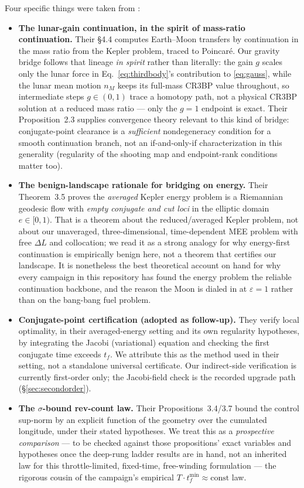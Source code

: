 \documentclass[11pt]{article}
\begin{document}
Four specific things were taken from \cite{BCP2010}:
\begin{itemize}
\item \textbf{The lunar-gain continuation, in the spirit of mass-ratio
  continuation.} Their \S 4.4 computes Earth--Moon transfers by
  continuation in the mass ratio from the Kepler problem, traced to
  Poincar\'e. Our gravity bridge follows that lineage \emph{in spirit}
  rather than literally: the gain $g$ scales only the lunar force in
  Eq.~\eqref{eq:thirdbody}'s contribution to \eqref{eq:gauss}, while the
  lunar mean motion $n_M$ keeps its full-mass CR3BP value throughout, so
  intermediate steps $g \in (0,1)$ trace a homotopy path, not a physical
  CR3BP solution at a reduced mass ratio --- only the $g = 1$ endpoint is
  exact. Their Proposition~2.3 supplies convergence theory relevant to
  this kind of bridge: conjugate-point clearance is a \emph{sufficient}
  nondegeneracy condition for a smooth continuation branch, not an
  if-and-only-if characterization in this generality (regularity of the
  shooting map and endpoint-rank conditions matter too).
\item \textbf{The benign-landscape rationale for bridging on energy.}
  Their Theorem~3.5 proves the \emph{averaged} Kepler energy problem is a
  Riemannian geodesic flow with \emph{empty conjugate and cut loci} in the
  elliptic domain $e \in [0,1)$. That is a theorem about the
  reduced/averaged Kepler problem, not about our unaveraged,
  three-dimensional, time-dependent MEE problem with free $\Delta L$ and
  collocation; we read it as a strong analogy for why energy-first
  continuation is empirically benign here, not a theorem that certifies
  our landscape. It is nonetheless the best theoretical account on hand
  for why every campaign in this repository has found the energy problem
  the reliable continuation backbone, and the reason the Moon is dialed in
  at $\varepsilon = 1$ rather than on the bang-bang fuel problem.
\item \textbf{Conjugate-point certification (adopted as follow-up).} They
  verify local optimality, in their averaged-energy setting and its own
  regularity hypotheses, by integrating the Jacobi (variational) equation
  and checking the first conjugate time exceeds $t_f$. We attribute this
  as the method used in their setting, not a standalone universal
  certificate. Our indirect-side verification is currently first-order
  only; the Jacobi-field check is the recorded upgrade path
  (\S\ref{sec:secondorder}).
\item \textbf{The $\sigma$-bound rev-count law.} Their
  Propositions~3.4/3.7 bound the control sup-norm by an explicit function
  of the geometry over the cumulated longitude, under their stated
  hypotheses. We treat this as a \emph{prospective comparison} --- to be
  checked against those propositions' exact variables and hypotheses once
  the deep-rung ladder results are in hand, not an inherited law for this
  throttle-limited, fixed-time, free-winding formulation --- the rigorous
  cousin of the campaign's empirical
  $T \cdot t_f^{\min} \approx \mathrm{const}$ law.
\end{itemize}
\end{document}
